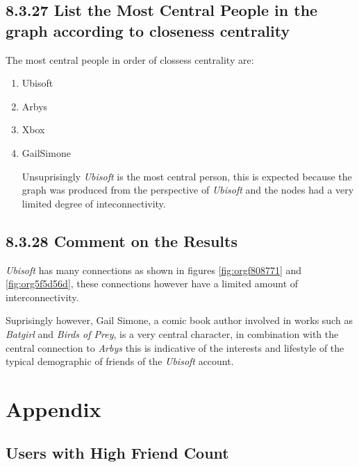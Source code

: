 \documentclass[11pt]{article}
\begin{document}
\subsection{8.3.27 List the Most Central People in the graph according to closeness centrality}
\label{sec:orgcfbb0d9}
The most central people in order of clossess centrality are:

\begin{enumerate}
\item Ubisoft
\item Arbys
\item Xbox
\item GailSimone

Unsuprisingly \emph{Ubisoft} is the most central person, this is expected because the graph was produced from the perspective of \emph{Ubisoft} and the nodes had a very limited degree of inteconnectivity.
\end{enumerate}


\subsection{8.3.28 Comment on the Results}
\label{sec:org54bd84c}
\emph{Ubisoft} has many connections as shown in figures \ref{fig:orgf808771} and \ref{fig:org5f5d56d}, these connections however have a limited amount of interconnectivity.

Suprisingly however, Gail Simone, a comic book author involved in works such as \emph{Batgirl} and \emph{Birds of Prey}, is a very central character, in combination with the central connection to \emph{Arbys} this is indicative of the interests and lifestyle of the typical demographic of friends of the \emph{Ubisoft} account.
\section{Appendix}
\label{sec:orgdf27c7e}
\subsection{Users with High Friend Count}
\label{sec:orga4442df}
\end{document}
